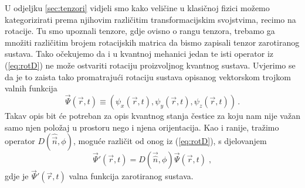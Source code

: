 U odjeljku \ref{sec:tenzori} vidjeli smo kako veličine u klasičnoj fizici
možemo kategorizirati prema njihovim različitim transformacijskim svojstvima,
recimo na rotacije. Tu smo upoznali tenzore, gdje ovisno o rangu tenzora,
trebamo ga množiti različitim brojem rotacijskih matrica da bismo zapisali
tenzor zarotiranog sustava. Tako očekujemo da i u kvantnoj mehanici jedan
te isti operator
iz (\ref{eq:rotD}) ne može ostvariti
rotaciju proizvoljnog kvantnog sustava.
Uvjerimo se da je to zaista tako
promatrajući rotaciju sustava opisanog vektorskom trojkom valnih funkcija
\begin{equation}
  \vec{\Psi}(\vec{r},t) \equiv (\psi_{x}(\vec{r}, t),
 \psi_{y}(\vec{r}, t), \psi_{z}(\vec{r}, t)) \,.
 \label{eq:psitrojka}
\end{equation}
Takav opis bit će potreban za opis kvantnog stanja čestice za koju nam nije
važan samo njen položaj u prostoru nego i njena orijentacija.
Kao i ranije, tražimo operator $D(\hat{\vec{n}}, \phi)$, moguće
različit od onog iz (\ref{eq:rotD}), s djelovanjem
\begin{equation}
  \vec{\Psi}'(\vec{r},t) = D
(\vec{\hat{n}},\phi) \vec{\Psi}(\vec{r},t) \;,
\end{equation}
gdje je $\vec{\Psi}'(\vec{r},t)$ valna funkcija zarotiranog sustava.

\centerline{}

